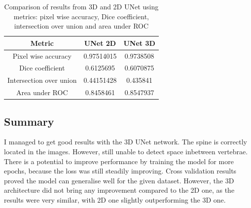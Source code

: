 
\begin{table}[ht!]
\centering
\begin{tabular}{@{}ccc@{}}
\toprule
Metric                  & UNet 2D    & UNet 3D   \\ \midrule
Pixel wise accuracy     & 0.97514015 & 0.9738508 \\
Dice coefficient        & 0.6125695 & 0.6070875 \\
Intersection over union & 0.44151428 & 0.435841  \\
Area under ROC          & 0.8458461  & 0.8547937 \\ \bottomrule
\end{tabular}
\caption[UNet 2D and UNet 3D results]{Comparison of results from 3D and 2D UNet using metrics: pixel wise accuracy, Dice coefficient, intersection over union and area under ROC}
\label{tab:results-spine-2D}
\end{table}

\subsection{Summary}
I managed to get good results with the 3D UNet network. The spine is correctly located in the images. However, still unable to detect space inbetween vertebrae. There is a potential to improve performance by training the model for more epochs, because the loss was still steadily improving. Cross validation results proved the model can generalise well for the given dataset. However, the 3D architecture did not bring any improvement compared to the 2D one, as the results were very similar, with 2D one slightly outperforming the 3D one. 